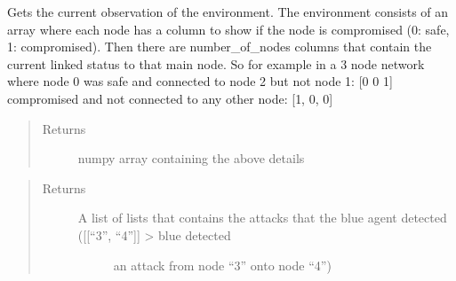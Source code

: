 \documentclass[letterpaper,10pt,english]{sphinxmanual}
\begin{document}
\begin{fulllineitems}

\begin{fulllineitems}
\label{\detokenize{source/yawning_titan.envs.generic.core:yawning_titan.envs.generic.core.network_interface.NetworkInterface.get_current_observation}}
\sphinxAtStartPar
Gets the current observation of the environment. The environment consists of an array where each node has a
column to show if the node is compromised (0: safe, 1: compromised). Then there are number\_of\_nodes columns that
contain the current linked status to that main node. So for example in a 3 node network where node 0 was safe
and connected to node 2 but not node 1:
{[}0 0 1{]}
compromised and not connected to any other node:
{[}1, 0, 0{]}
\begin{quote}\begin{description}
\item[{Returns}] \leavevmode
\sphinxAtStartPar
numpy array containing the above details

\end{description}\end{quote}

\end{fulllineitems}


\begin{fulllineitems}
\label{\detokenize{source/yawning_titan.envs.generic.core:yawning_titan.envs.generic.core.network_interface.NetworkInterface.get_detected_attacks}}\begin{quote}\begin{description}
\item[{Returns}] \leavevmode
\sphinxAtStartPar
\begin{description}
\item[{A list of lists that contains the attacks that the blue agent detected ({[}{[}“3”, “4”{]}{]} \sphinxhyphen{}\textgreater{} blue detected}] \leavevmode
\sphinxAtStartPar
an attack from node “3” onto node “4”)


\end{description}
\end{description}
\end{quote}
\end{fulllineitems}
\end{fulllineitems}
\end{document}
